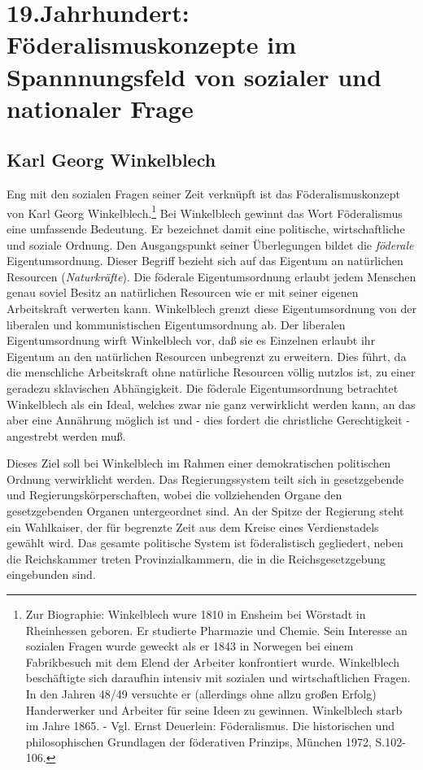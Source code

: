 \documentclass[a4paper,12pt]{article}
\begin{document}
\section{19.Jahrhundert: Föderalismuskonzepte im Spannnungsfeld von
sozialer und nationaler Frage}

\subsection{Karl Georg Winkelblech}

Eng mit den sozialen Fragen seiner Zeit verknüpft ist das
Föderalismuskonzept von Karl Georg Winkelblech.\footnote{Zur
Biographie: Winkelblech wure 1810 in Ensheim bei Wörstadt in
Rheinhessen geboren. Er studierte Pharmazie und Chemie. Sein
Interesse an sozialen Fragen wurde geweckt als er 1843 in Norwegen
bei einem Fabrikbesuch mit dem Elend der Arbeiter konfrontiert
wurde. Winkelblech beschäftigte sich daraufhin intensiv mit
sozialen und wirtschaftlichen Fragen. In den Jahren 48/49 versuchte
er (allerdings ohne allzu großen Erfolg) Handerwerker und Arbeiter
für seine Ideen zu gewinnen. Winkelblech starb im Jahre 1865. -
Vgl. Ernst Deuerlein: Föderalismus. Die historischen und
philosophischen Grundlagen der föderativen Prinzips, München 1972,
S.102-106.} Bei Winkelblech gewinnt das Wort Föderalismus eine
umfassende Bedeutung. Er bezeichnet damit eine politische,
wirtschaftliche und soziale Ordnung. Den Ausgangspunkt seiner
Überlegungen bildet die {\em föderale} Eigentumsordnung. Dieser
Begriff bezieht sich auf das Eigentum an natürlichen Resourcen
({\em Naturkräfte}). Die föderale Eigentumsordnung erlaubt jedem
Menschen genau soviel Besitz an natürlichen Resourcen wie er mit
seiner eigenen Arbeitskraft verwerten kann. Winkelblech grenzt
diese Eigentumsordnung von der liberalen und kommunistischen
Eigentumsordnung ab. Der liberalen Eigentumsordnung wirft
Winkelblech vor, daß sie es Einzelnen erlaubt ihr Eigentum an den
natürlichen Resourcen unbegrenzt zu erweitern. Dies führt, da die
menschliche Arbeitskraft ohne natürliche Resourcen völlig nutzlos
ist, zu einer geradezu sklavischen Abhängigkeit. Die föderale
Eigentumsordnung betrachtet Winkelblech als ein Ideal, welches zwar
nie ganz verwirklicht werden kann, an das aber eine Annährung
möglich ist und - dies fordert die christliche Gerechtigkeit -
angestrebt werden muß.

Dieses Ziel soll bei Winkelblech im Rahmen einer demokratischen
politischen Ordnung verwirklicht werden. Das Regierungssystem teilt
sich in gesetzgebende und Regierungskörperschaften, wobei die
vollziehenden Organe den gesetzgebenden Organen untergeordnet
sind. An der Spitze der Regierung steht ein Wahlkaiser, der für
begrenzte Zeit aus dem Kreise eines Verdienstadels gewählt
wird. Das gesamte politische System ist föderalistisch gegliedert,
neben die Reichskammer treten Provinzialkammern, die in die
Reichsgesetzgebung eingebunden sind.
\end{document}
